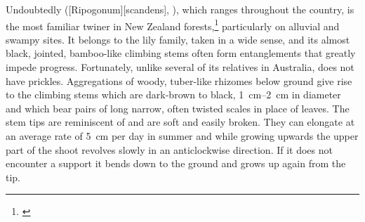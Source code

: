 Undoubtedly  ([Ripogonum][scandens], ), which ranges throughout the country, is the most familiar twiner in New Zealand forests,\footnote{\cite{macmillan1973biological}} particularly on alluvial and swampy sites.
It belongs to the lily family, taken in a wide sense, and its almost black, jointed, bamboo-like climbing stems often form entanglements that greatly impede progress.
Fortunately, unlike several of its relatives in Australia,  does not have prickles.
Aggregations of woody, tuber-like rhizomes below ground give rise to the climbing stems which are dark-brown to black, \SIrange{1}{2}{\centi\metre} in diameter and which bear pairs of long narrow, often twisted scales in place of leaves.
The stem tips are reminiscent of  and are soft and easily broken.
They can elongate at an average rate of \SI{5}{\centi\metre} per day in summer and while growing upwards the upper part of the shoot revolves slowly in an anticlockwise direction.
If it does not encounter a support it bends down to the ground and grows up again from the tip.

